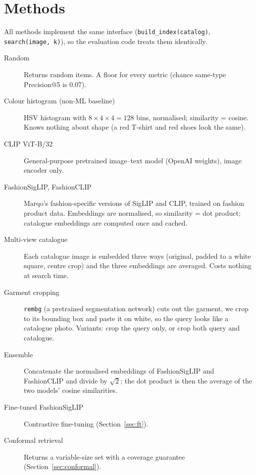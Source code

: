 \documentclass[11pt,a4paper]{article}
\begin{document}
\section{Methods}

All methods implement the same interface (\texttt{build\_index(catalog)}, \texttt{search(image, k)}),
so the evaluation code treats them identically.

\begin{description}
  \item[Random] Returns random items. A floor for every metric (chance same-type Precision@5 is 0.07).
  \item[Colour histogram (non-ML baseline)] HSV histogram with $8\times4\times4=128$ bins, normalised;
        similarity = cosine. Knows nothing about shape (a red T-shirt and red shoes look the same).
  \item[CLIP ViT-B/32] General-purpose pretrained image--text model (OpenAI weights), image encoder only.
  \item[FashionSigLIP, FashionCLIP] Marqo's fashion-specific versions of SigLIP and CLIP, trained on
        fashion product data. Embeddings are normalised, so similarity = dot product; catalogue
        embeddings are computed once and cached.
  \item[Multi-view catalogue] Each catalogue image is embedded three ways (original, padded to a
        white square, centre crop) and the three embeddings are averaged. Costs nothing at search time.
  \item[Garment cropping] \texttt{rembg} (a pretrained segmentation network) cuts out the garment,
        we crop to its bounding box and paste it on white, so the query looks like a catalogue photo.
        Variants: crop the query only, or crop both query and catalogue.
  \item[Ensemble] Concatenate the normalised embeddings of FashionSigLIP and FashionCLIP and divide by
        $\sqrt{2}$; the dot product is then the average of the two models' cosine similarities.
  \item[Fine-tuned FashionSigLIP] Contrastive fine-tuning (Section~\ref{sec:ft}).
  \item[Conformal retrieval] Returns a variable-size set with a coverage guarantee
        (Section~\ref{sec:conformal}).
\end{description}

\end{document}
